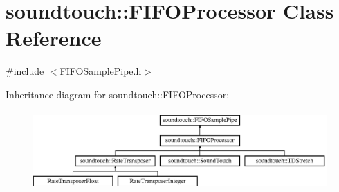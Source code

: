\hypertarget{classsoundtouch_1_1_f_i_f_o_processor}{}\section{soundtouch\+:\+:F\+I\+F\+O\+Processor Class Reference}
\label{classsoundtouch_1_1_f_i_f_o_processor}


{\ttfamily \#include $<$F\+I\+F\+O\+Sample\+Pipe.\+h$>$}

Inheritance diagram for soundtouch\+:\+:F\+I\+F\+O\+Processor\+:\begin{figure}[H]
\begin{center}
\leavevmode
\includegraphics[height=3.010753cm]{classsoundtouch_1_1_f_i_f_o_processor}
\end{center}
\end{figure}

